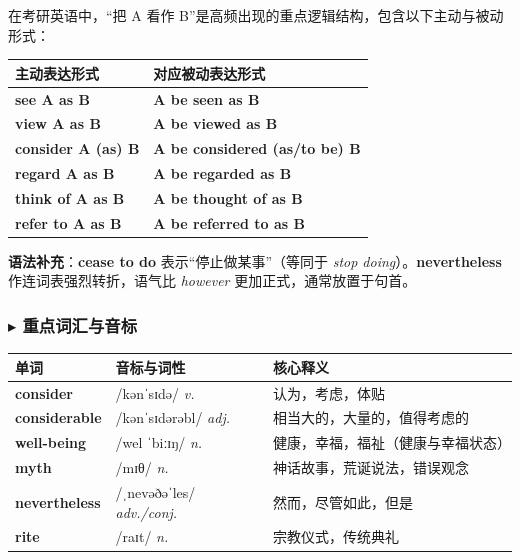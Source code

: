\documentclass[cn,normal,11pt]{elegantnote}
\newcommand{\retrokey}[1]{{\color{accentcolor}\textbf{#1}}}
\renewcommand{\citshape}{\kaishu\fontspec{Arial}}
\begin{document}
\begin{proposition}[“把 A 看作 B”的经典句型拓展]
  在考研英语中，“把 A 看作 B”是高频出现的重点逻辑结构，包含以下主动与被动形式：
  \begin{table}[H]
    \centering
    \small
    \begin{tabularx}{\textwidth}{p{5.5cm} X}
      \toprule
      \textbf{主动表达形式} & \textbf{对应被动表达形式} \\
      \midrule
      \textbf{see A as B} & \textbf{A be seen as B} \\
      \textbf{view A as B} & \textbf{A be viewed as B} \\
      \textbf{consider A (as) B} & \textbf{A be considered (as/to be) B} \\
      \textbf{regard A as B} & \textbf{A be regarded as B} \\
      \textbf{think of A as B} & \textbf{A be thought of as B} \\
      \textbf{refer to A as B} & \textbf{A be referred to as B} \\
      \bottomrule
    \end{tabularx}
  \end{table}
  \textbf{语法补充}：\textbf{cease to do} 表示“停止做某事”（等同于 \textit{stop doing}）。\textbf{nevertheless} 作连词表强烈转折，语气比 \textit{however} 更加正式，通常放置于句首。
\end{proposition}

\subsubsection*{$\blacktriangleright$ 重点词汇与音标}
\noindent
\begin{tabularx}{\textwidth}{l X p{7cm}}
  \toprule
  \textbf{单词} & \textbf{音标与词性} & \textbf{核心释义} \\
  \midrule
  \retrokey{consider} & {\citshape /kənˈsɪdə/} \textit{v.} & 认为，考虑，体贴 \\
  \midrule
  \retrokey{considerable} & {\citshape /kənˈsɪdərəbl/} \textit{adj.} & 相当大的，大量的，值得考虑的 \\
  \midrule
  \retrokey{well-being} & {\citshape /wel ˈbiːɪŋ/} \textit{n.} & 健康，幸福，福祉（健康与幸福状态） \\
  \midrule
  \retrokey{myth} & {\citshape /mɪθ/} \textit{n.} & 神话故事，荒诞说法，错误观念 \\
  \midrule
  \retrokey{nevertheless} & {\citshape /ˌnevəðəˈles/} \textit{adv./conj.} & 然而，尽管如此，但是 \\
  \midrule
  \retrokey{rite} & {\citshape /raɪt/} \textit{n.} & 宗教仪式，传统典礼 \\
  \bottomrule
\end{tabularx}
\end{document}
